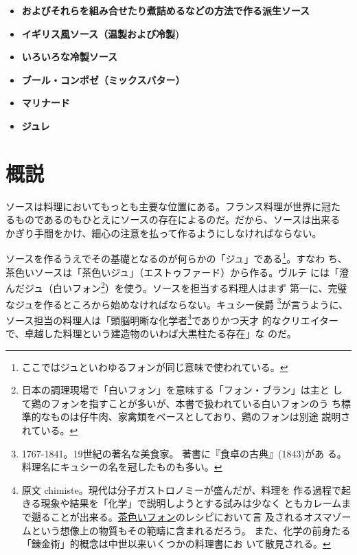 
\begin{itemize}
\item
  \textbf{およびそれらを組み合せたり煮詰めるなどの方法で作る派生ソース}
\item
  \textbf{イギリス風ソース（温製および冷製)}
\item
  \textbf{いろいろな冷製ソース}
\item
  \textbf{ブール・コンポゼ（ミックスバター）}
\item
  \textbf{マリナード}
\item
  \textbf{ジュレ}
\end{itemize}

\hypertarget{osbservation-sur-la-sauce}{%
\section{概説}\label{osbservation-sur-la-sauce}}

ソースは料理においてもっとも主要な位置にある。フランス料理が世界に冠た
るものであるのもひとえにソースの存在によるのだ。だから、ソースは出来る
かぎり手間をかけ、細心の注意を払って作るようにしなければならない。

ソースを作るうえでその基礎となるのが何らかの「ジュ」である\footnote{ここではジュといわゆるフォンが同じ意味で使われている。}。すなわ
ち、茶色いソースは「茶色いジュ」（エストゥファード）から作る。ヴルテ
には「澄んだジュ（白いフォン\footnote{日本の調理現場で「白いフォン」を意味する「フォン・ブラン」は主と
  して鶏のフォンを指すことが多いが、本書で扱われている白いフォンのう
  ち標準的なものは仔牛肉、家禽類をベースとしており、鶏のフォンは別途
  説明されている。}）を使う。ソースを担当する料理人はまず
第一に、完璧なジュを作るところから始めなければならない。キュシー侯爵
\footnote{1767-1841。19世紀の著名な美食家。
  著書に『食卓の古典』(1843)があ
  る。料理名にキュシーの名を冠したものも多い。}が言うように、ソース担当の料理人は「頭脳明晰な化学者\footnote{原文
  chimiste。現代は分子ガストロノミーが盛んだが、料理を
  作る過程で起きる現象や結果を「化学」で説明しようとする試みは少なく
  ともカレームまで遡ることが出来る。\protect\hyperlink{fonds-brun}{茶色いフォン}のレシピにおいて言
  及されるオスマゾームという想像上の物質もその範疇に含まれるだろう。
  また、化学の前身たる「錬金術」的概念は中世以来いくつかの料理書にお
  いて散見される。}でありかつ天才
的なクリエイターで、卓越した料理という建造物のいわば大黒柱たる存在」な
のだ。

